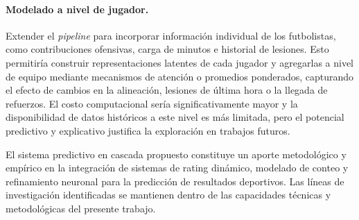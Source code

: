 \paragraph{Modelado a nivel de jugador.} Extender el \textit{pipeline} para incorporar informaci\'on individual de los futbolistas, como contribuciones ofensivas, carga de minutos e historial de lesiones. Esto permitir\'ia construir representaciones latentes de cada jugador y agregarlas a nivel de equipo mediante mecanismos de atenci\'on o promedios ponderados, capturando el efecto de cambios en la alineaci\'on, lesiones de \'ultima hora o la llegada de refuerzos. El costo computacional ser\'ia significativamente mayor y la disponibilidad de datos hist\'oricos a este nivel es m\'as limitada, pero el potencial predictivo y explicativo justifica la exploraci\'on en trabajos futuros.

El sistema predictivo en cascada propuesto constituye un aporte metodol\'ogico y emp\'irico en la integraci\'on de sistemas de rating din\'amico, modelado de conteo y refinamiento neuronal para la predicci\'on de resultados deportivos. Las l\'ineas de investigaci\'on identificadas se mantienen dentro de las capacidades t\'ecnicas y metodol\'ogicas del presente trabajo.